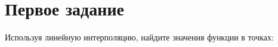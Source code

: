 \maketitle
\tableofcontents
\newpage

\section{Первое задание}
Используя линейную интерполяцию, найдите значения функции в точках:
